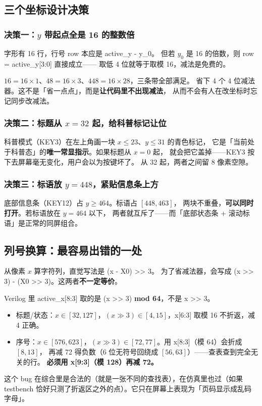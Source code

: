 \documentclass[10pt,a4paper]{article}
\newcommand{\code}[1]{{\ttfamily\small #1}}
\begin{document}
\subsection{三个坐标设计决策}

\subsubsection*{决策一：$y$ 带起点全是 16 的整数倍}

字形有 16 行，行号 \code{row} 本应是 \code{active\_y - y\_0}。
但若 $y_0$ 是 16 的倍数，则 \code{row = active\_y[3:0]} 直接成立——
取低 4 位就等于取模 16，减法是免费的。

$16=16\times1$、$48=16\times3$、$448=16\times28$，三条带全部满足。
省下 4 个 4 位减法器。这不是「省一点点」，而是\textbf{让代码里不出现减法}，
从而不会有人在改坐标时忘记同步改减法。

\subsubsection*{决策二：标题从 $x=32$ 起，给科普标记让位}

科普模式（KEY3）在左上角画一块 $x\le23$、$y\le31$ 的青色标记，
它是「当前处于科普态」的\textbf{唯一常显指示}。如果标题从 $x=0$ 起，
就会把它盖掉——KEY3 按下去屏幕毫无变化，用户会以为按键坏了。
从 32 起，两者之间留 8 像素空隙。

\subsubsection*{决策三：标语放 $y=448$，紧贴信息条上方}

底部信息条（KEY12）占 $y\ge464$。标语占 $[448,463]$，
两块不重叠，\textbf{可以同时打开}。若标语放在 $y=464$ 以下，
两者就互斥了——而「底部状态条 + 滚动标语」是正常的同屏组合。

\subsection{列号换算：最容易出错的一处}
\label{sec:colmap}

从像素 $x$ 算字符列，直觉写法是 \code{(x - X0) >> 3}。
为了省减法器，会写成 \code{(x >> 3) - (X0 >> 3)}。这两者\textbf{不一定等价}。

\begin{dswarn}
Verilog 里 \code{active\_x[8:3]} 取的是 \code{(x >> 3) \textbf{mod 64}}，不是 \code{x >> 3}。
\begin{itemize}
\item 标题/状态：$x\in[32,127]$，$(x\gg3)\in[4,15]$，\code{x[6:3]} 取模 16 不折返，减 4 正确。
\item 序号：$x\in[576,623]$，$(x\gg3)\in[72,77]$。用 \code{x[8:3]}（模 64）会折成 $[8,13]$，
      再减 72 得负数（6 位无符号回绕成 $[56,63]$）——查表查到完全无关的行。
      \textbf{必须用 \code{x[9:3]}（模 128）再减 72。}
\end{itemize}
这个 bug 在综合里是合法的（就是一张不同的查找表），在仿真里也过（如果 testbench
恰好只测了折返区之外的点）。它只在屏幕上表现为「页码显示成乱码字母」。
\end{dswarn}
\end{document}
